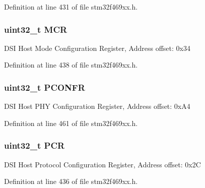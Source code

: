 Definition at line 431 of file stm32f469xx.\+h.

\subsubsection[{\texorpdfstring{M\+CR}{MCR}}]{ uint32\+\_\+t M\+CR}\hypertarget{struct_d_s_i___type_def_a27af4e9f888f0b7b1e8da7e002d98798}{}\label{struct_d_s_i___type_def_a27af4e9f888f0b7b1e8da7e002d98798}
D\+SI Host Mode Configuration Register, Address offset\+: 0x34 

Definition at line 438 of file stm32f469xx.\+h.

\subsubsection[{\texorpdfstring{P\+C\+O\+N\+FR}{PCONFR}}]{ uint32\+\_\+t P\+C\+O\+N\+FR}\hypertarget{struct_d_s_i___type_def_a3b3d7b0505944ec6cd0657f122cbc40e}{}\label{struct_d_s_i___type_def_a3b3d7b0505944ec6cd0657f122cbc40e}
D\+SI Host P\+HY Configuration Register, Address offset\+: 0x\+A4 

Definition at line 461 of file stm32f469xx.\+h.

\subsubsection[{\texorpdfstring{P\+CR}{PCR}}]{ uint32\+\_\+t P\+CR}\hypertarget{struct_d_s_i___type_def_a6091bd215b74df162dd3bc51621c63ca}{}\label{struct_d_s_i___type_def_a6091bd215b74df162dd3bc51621c63ca}
D\+SI Host Protocol Configuration Register, Address offset\+: 0x2C 

Definition at line 436 of file stm32f469xx.\+h.

